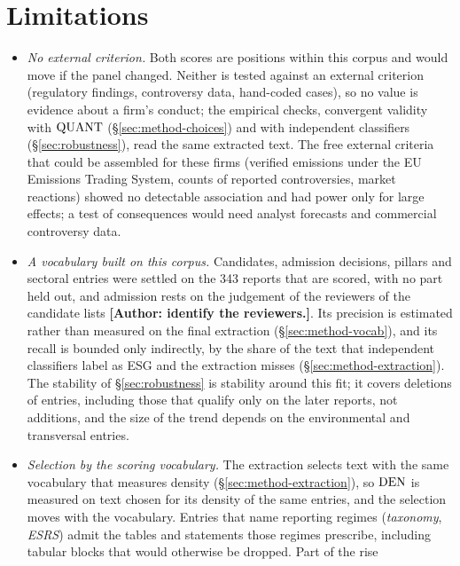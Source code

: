 \section{Limitations}
\label{sec:limitations}

\begin{itemize}
\setlength{\itemsep}{1pt}\setlength{\parskip}{0pt}
\item \emph{No external criterion.} Both scores are positions within this
  corpus and would move if the panel changed. Neither is tested against an
  external criterion (regulatory findings, controversy data, hand-coded
  cases), so no value is evidence about a firm's conduct; the empirical
  checks, convergent validity with $\mathrm{QUANT}$ (\S\ref{sec:method-choices}) and
  with independent classifiers (\S\ref{sec:robustness}), read the same
  extracted text.
  The free external criteria that could be assembled for these firms
  (verified emissions under the EU Emissions Trading System, counts of
  reported controversies, market reactions) showed no detectable association
  and had power only for large effects; a test of consequences would need
  analyst forecasts and commercial controversy data.
\item \emph{A vocabulary built on this corpus.} Candidates, admission
  decisions, pillars and sectoral entries were settled on the 343 reports
  that are scored, with no part held out, and admission rests on the
  judgement of the reviewers of the candidate lists
  \textbf{[Author: identify the reviewers.]}. Its precision is estimated
  rather than measured on the final extraction (\S\ref{sec:method-vocab}),
  and its recall is bounded only indirectly, by the share of the text that
  independent classifiers label as ESG and the extraction misses
  (\S\ref{sec:method-extraction}). The stability of \S\ref{sec:robustness} is
  stability around this fit; it covers deletions of entries, including those
  that qualify only on the later reports, not additions, and the size of the
  trend depends on the environmental and transversal entries.
\item \emph{Selection by the scoring vocabulary.} The extraction selects text
  with the same vocabulary that measures density
  (\S\ref{sec:method-extraction}), so $\mathrm{DEN}$ is measured on text chosen
  for its density of the same entries, and the selection moves with the
  vocabulary. Entries that name reporting regimes (\emph{taxonomy},
  \emph{ESRS}) admit the tables and statements those regimes prescribe,
  including tabular blocks that would otherwise be dropped. Part of the rise

\end{itemize}
